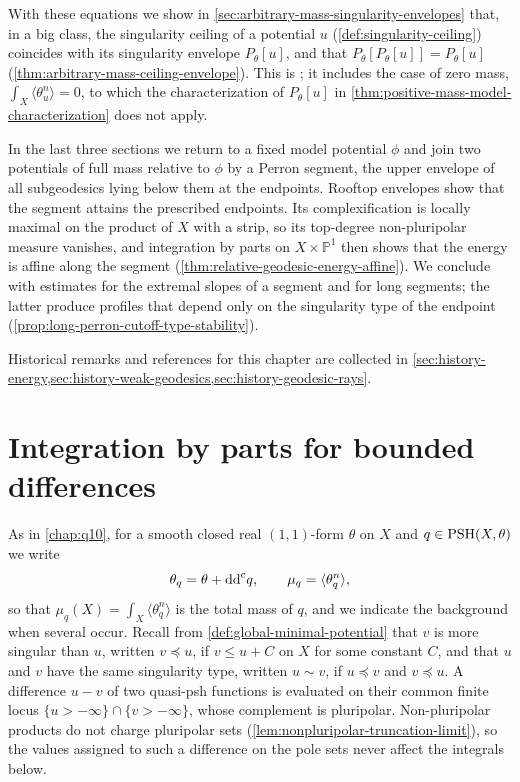 With these equations we show in \cref{sec:arbitrary-mass-singularity-envelopes} that, in a big class, the singularity ceiling of a potential $u$ (\cref{def:singularity-ceiling}) coincides with its singularity envelope $P_\theta[u]$, and that $P_\theta[P_\theta[u]]=P_\theta[u]$ (\cref{thm:arbitrary-mass-ceiling-envelope}). This is \cite[Theorem~1.2]{PSWZ26}; it includes the case of zero mass, $\int_X\langle\theta_u^n\rangle=0$, to which the characterization of $P_\theta[u]$ in \cref{thm:positive-mass-model-characterization} does not apply.

In the last three sections we return to a fixed model potential $\phi$ and join two potentials of full mass relative to $\phi$ by a Perron segment, the upper envelope of all subgeodesics lying below them at the endpoints. Rooftop envelopes show that the segment attains the prescribed endpoints. Its complexification is locally maximal on the product of $X$ with a strip, so its top-degree non-pluripolar measure vanishes, and integration by parts on $X\times\mathbb P^1$ then shows that the energy is affine along the segment (\cref{thm:relative-geodesic-energy-affine}). We conclude with estimates for the extremal slopes of a segment and for long segments; the latter produce profiles that depend only on the singularity type of the endpoint (\cref{prop:long-perron-cutoff-type-stability}).

Historical remarks and references for this chapter are collected in \cref{sec:history-energy,sec:history-weak-geodesics,sec:history-geodesic-rays}.

\section{Integration by parts for bounded differences}
\label{sec:singular-bounded-difference-integration}
As in \cref{chap:q10}, for a smooth closed real $(1,1)$-form $\theta$ on $X$ and $q\in\mathrm{PSH}(X,\theta)$ we write
\[
 \theta_q=\theta+\mathrm{dd}^{\mathrm{c}} q,\qquad \mu_q=\langle\theta_q^n\rangle,
\]
so that $\mu_q(X)=\int_X\langle\theta_q^n\rangle$ is the total mass of $q$, and we indicate the background when several occur. Recall from \cref{def:global-minimal-potential} that $v$ is more singular than $u$, written $v\preceq u$, if $v\leq u+C$ on $X$ for some constant $C$, and that $u$ and $v$ have the same singularity type, written $u\sim v$, if $u\preceq v$ and $v\preceq u$. A difference $u-v$ of two quasi-psh functions is evaluated on their common finite locus $\{u>-\infty\}\cap\{v>-\infty\}$, whose complement is pluripolar. Non-pluripolar products do not charge pluripolar sets (\cref{lem:nonpluripolar-truncation-limit}), so the values assigned to such a difference on the pole sets never affect the integrals below.

